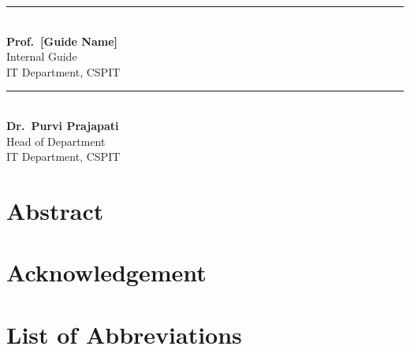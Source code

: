 \documentclass[a4paper,12pt]{report}
\begin{document}
\vspace{2.5cm}
\begin{minipage}[t]{0.45\textwidth}
\centering
\rule{5cm}{0.4pt}\\
\textbf{Prof.\ [Guide Name]}\\
Internal Guide\\
IT Department, CSPIT
\end{minipage}
\hfill
\begin{minipage}[t]{0.45\textwidth}
\centering
\rule{5cm}{0.4pt}\\
\textbf{Dr.\ Purvi Prajapati}\\
Head of Department\\
IT Department, CSPIT
\end{minipage}
\newpage

\chapter*{Abstract}

\newpage

\chapter*{Acknowledgement}

\newpage

\tableofcontents
\newpage
\listoffigures
\newpage
\listoftables
\newpage

\chapter*{List of Abbreviations}

\newpage

\pagestyle{fancy}











\appendix

\end{document}
